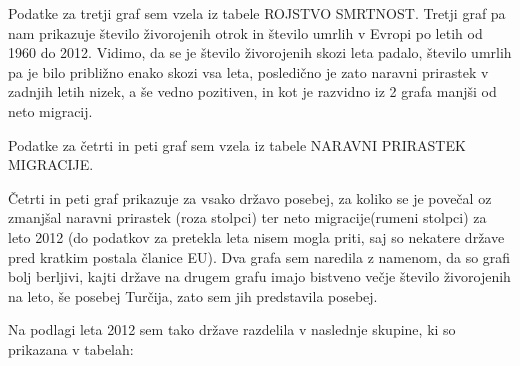\documentclass[11pt,a4paper]{article}
\begin{document}
Podatke za tretji graf sem vzela iz tabele ROJSTVO SMRTNOST.
Tretji graf pa nam prikazuje število živorojenih otrok in število umrlih v Evropi po letih od 1960 do 2012. Vidimo, da se je število živorojenih skozi leta padalo, število umrlih pa je bilo približno enako skozi vsa leta, posledično je zato naravni prirastek v zadnjih letih nizek, a še vedno pozitiven, in kot je razvidno iz 2 grafa manjši od neto migracij.



\newpage
Podatke za četrti in peti graf sem vzela iz tabele NARAVNI PRIRASTEK MIGRACIJE.

Četrti in peti  graf prikazuje za vsako državo posebej, za koliko se je povečal oz zmanjšal naravni prirastek (roza stolpci) ter neto migracije(rumeni stolpci) za leto 2012 (do podatkov za pretekla leta nisem mogla priti, saj so nekatere države pred kratkim postala članice EU).
Dva grafa sem naredila z namenom, da so grafi bolj berljivi, kajti države na drugem grafu imajo bistveno večje število živorojenih na leto, še posebej Turčija, zato sem jih predstavila posebej.




\newline
\newline
\newline
Na podlagi leta 2012 sem tako države razdelila v naslednje skupine, ki so prikazana v tabelah:
\end{document}
